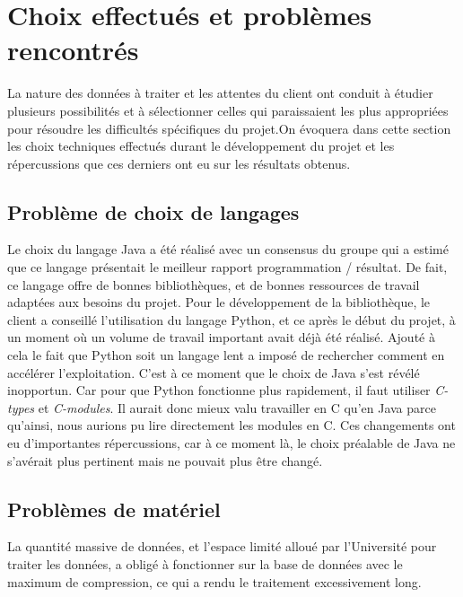\chapter{Choix effectués et problèmes rencontrés}

La nature des données à traiter et les attentes du client ont conduit à étudier plusieurs possibilités et à sélectionner celles qui paraissaient les plus appropriées pour résoudre les difficultés spécifiques du projet.On évoquera dans cette section les choix techniques effectués durant le développement du projet et les répercussions que ces derniers ont eu sur les résultats obtenus. 

\section{Problème de choix de langages}
Le choix du langage Java a été réalisé avec un consensus du groupe qui a estimé que ce langage présentait le meilleur rapport programmation / résultat. De fait, ce langage offre de bonnes bibliothèques, et de bonnes ressources de travail adaptées aux besoins du projet. 
Pour le développement de la bibliothèque, le client a conseillé l'utilisation du langage Python, et ce après le début du projet, à un moment où un volume de travail important avait déjà été réalisé. Ajouté à cela le fait que Python soit un langage lent a imposé de rechercher comment en accélérer l'exploitation. C'est à ce moment que le choix de Java s'est révélé inopportun. Car pour que Python fonctionne plus rapidement, il faut utiliser \textit{C-types} et \textit{C-modules}. Il aurait donc mieux valu travailler en C qu'en Java parce qu'ainsi, nous aurions pu lire directement les modules en C. Ces changements ont eu d'importantes répercussions, car à ce moment là, le choix préalable de Java ne s'avérait plus pertinent mais ne pouvait plus être changé.  

\section{Problèmes de matériel}
La quantité massive de données, et l'espace limité alloué par l'Université pour traiter les données, a obligé à fonctionner sur la base de données avec le maximum de compression, ce qui a rendu le traitement excessivement long.
